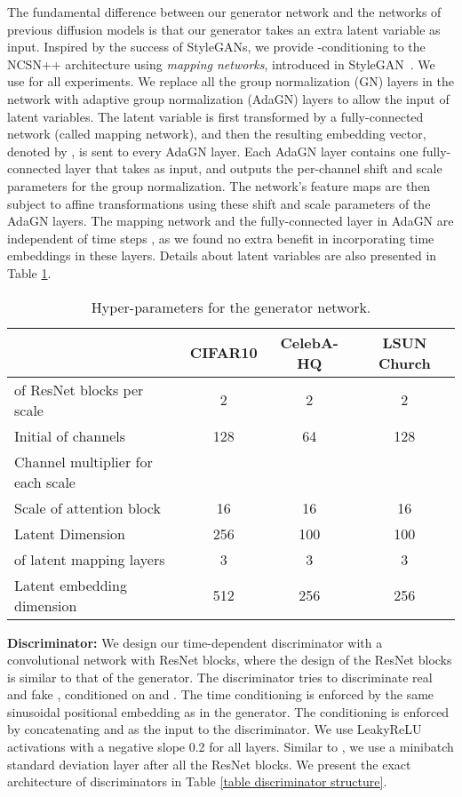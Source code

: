 The fundamental difference between our generator network and the networks of previous diffusion models is that our generator takes an extra latent variable  as input. Inspired by the success of StyleGANs, we provide -conditioning to the NCSN++ architecture using \textit{mapping networks}, introduced in StyleGAN~\citep{karras2019style}. We use  for all experiments. We replace all the group normalization (GN) layers in the network with adaptive group normalization (AdaGN) layers to allow the input of latent variables. The latent variable  is first transformed by a fully-connected network (called mapping network), and then the resulting embedding vector, denoted by , is sent to every AdaGN layer. Each AdaGN layer contains one fully-connected layer that takes  as input, and outputs the per-channel shift and scale parameters for the group normalization. The network's feature maps are then subject to affine transformations using these shift and scale parameters of the AdaGN layers. The mapping network and the fully-connected layer in AdaGN are independent of time steps , as we found no extra benefit in incorporating time embeddings in these layers. Details about latent variables are also presented in Table \ref{table generator structure}. 

\begin{table}
\centering
\caption{Hyper-parameters for the generator network.}
\label{table generator structure}
\begin{tabular}{lccc}
\toprule
& CIFAR10 & CelebA-HQ & LSUN Church 
\\ \midrule
 of ResNet blocks per scale &2&2&2\\
Initial  of channels &128& 64&128\\
Channel multiplier for each scale &&& \\
Scale of attention block & 16 & 16 & 16\\
Latent Dimension &256&100&100\\
 of latent mapping layers &3&3&3\\
Latent embedding dimension &512&256&256\\
\bottomrule
\end{tabular}
\end{table}



\textbf{Discriminator: }We design our time-dependent discriminator with a convolutional network with ResNet blocks, where the design of the ResNet blocks is similar to that of the generator. The discriminator tries to discriminate real and fake , conditioned on  and . The time conditioning is enforced by the same sinusoidal positional
embedding as in the generator. The  conditioning is enforced by concatenating  and  as the input to the discriminator. We use LeakyReLU activations with a negative slope 0.2 for all layers. Similar to \citet{karras2020analyzing}, we use a minibatch standard deviation layer after all the ResNet blocks. We present the exact architecture of discriminators in Table \ref{table discriminator structure}. 

